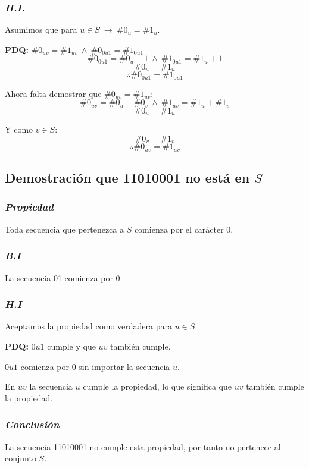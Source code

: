 \documentclass[../doc.tex]{subfiles}
\begin{document}
\subsubsection*{\emph{H.I.}}
Asumimos que para \(u \in S\ \rightarrow\ \#0_u = \#1_u\).

\textbf{PDQ:} \(\#0_{uv} = \#1_{uv}\ \land\ \#0_{0u1} = \#1_{0u1}\)
\[\#0_{0u1} = \#0_u + 1\ \land\ \#1_{0u1} = \#1_u + 1\]
\[\#0_u = \#1_u\]
\[\therefore \#0_{0u1} = \#1_{0u1}\]

\noindent Ahora falta demostrar que \(\#0_{uv} = \#1_{uv}\):
\[\#0_{uv} = \#0_u + \#0_v\ \land\ \#1_{uv} = \#1_u + \#1_v\]
\[\#0_u = \#1_u\]

\noindent Y como \(v \in S\):
\[\#0_v = \#1_v\]
\[\therefore \#0_{uv} = \#1_{uv}\]

\subsection{Demostración que 11010001 no está en \(S\)}

\subsubsection*{\emph{Propiedad}}
Toda secuencia que pertenezca a \(S\) comienza por el carácter 0.

\subsubsection*{\emph{B.I}}
La secuencia 01 comienza por 0.

\subsubsection*{\emph{H.I}}
Aceptamos la propiedad como verdadera para \(u \in S\).

\textbf{PDQ:} \(0u1\) cumple y que \(uv\) también cumple.

\noindent \(0u1\) comienza por 0 sin importar la secuencia \(u\).

\noindent En \(uv\) la secuencia \(u\) cumple la propiedad, lo que significa que \(uv\) también cumple la propiedad.

\subsubsection*{\emph{Conclusión}}
La secuencia 11010001 no cumple esta propiedad, por tanto no pertenece al conjunto \(S\).
\end{document}
